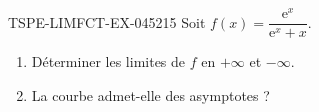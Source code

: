 \begin{exercice}{TSPE-LIMFCT-EX-045}{2}{15}
Soit $f(x) = \dfrac{\mathrm{e}^x}{\mathrm{e}^x + x}$.
\begin{enumerate}
  \item Déterminer les limites de $f$ en $+\infty$ et $-\infty$.
  \item La courbe admet-elle des asymptotes ?
\end{enumerate}
\end{exercice}
